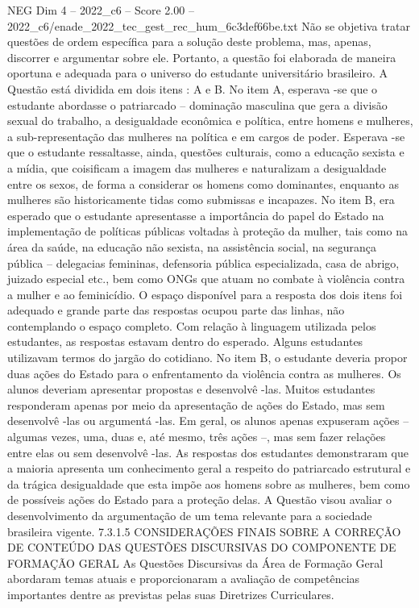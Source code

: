 \begin{textsample}{NEG Dim 4 – 2022\_c6 – Score 2.00 – 2022\_c6/enade\_2022\_tec\_gest\_rec\_hum\_6c3def66be.txt}
Não se objetiva tratar questões de ordem específica para a solução deste problema, mas, apenas, discorrer e argumentar sobre ele.
Portanto, a questão foi elaborada de maneira oportuna e adequada para o universo do estudante universitário brasileiro.
A Questão está dividida em dois itens : A e B.
No item A, esperava -se que o estudante abordasse o patriarcado – dominação masculina que gera a divisão sexual do trabalho, a desigualdade econômica e política, entre homens e mulheres, a sub-representação das mulheres na política e em cargos de poder.
Esperava -se que o estudante ressaltasse, ainda, questões culturais, como a educação sexista e a mídia, que coisificam a imagem das mulheres e naturalizam a desigualdade entre os sexos, de forma a considerar os homens como dominantes, enquanto as mulheres são historicamente tidas como submissas e incapazes.
No item B, era esperado que o estudante apresentasse a importância do papel do Estado na implementação de políticas públicas voltadas à proteção da mulher, tais como na área da saúde, na educação não sexista, na assistência social, na segurança pública – delegacias femininas, defensoria pública especializada, casa de abrigo, juizado especial etc., bem como ONGs que atuam no combate à violência contra a mulher e ao feminicídio.
O espaço disponível para a resposta dos dois itens foi adequado e grande parte das respostas ocupou parte das linhas, não contemplando o espaço completo.
Com relação à linguagem utilizada pelos estudantes, as respostas estavam dentro do esperado.
Alguns estudantes utilizavam termos do jargão do cotidiano.
No item B, o estudante deveria propor duas ações do Estado para o enfrentamento da violência contra as mulheres.
Os alunos deveriam apresentar propostas e desenvolvê -las.
Muitos estudantes responderam apenas por meio da apresentação de ações do Estado, mas sem desenvolvê -las ou argumentá -las.
Em geral, os alunos apenas expuseram ações – algumas vezes, uma, duas e, até mesmo, três ações –, mas sem fazer relações entre elas ou sem desenvolvê -las.
As respostas dos estudantes demonstraram que a maioria apresenta um conhecimento geral a respeito do patriarcado estrutural e da trágica desigualdade que esta impõe aos homens sobre as mulheres, bem como de possíveis ações do Estado para a proteção delas.
A Questão visou avaliar o desenvolvimento da argumentação de um tema relevante para a sociedade brasileira vigente. 7.3.1.5 CONSIDERAÇÕES FINAIS SOBRE A CORREÇÃO DE CONTEÚDO DAS QUESTÕES DISCURSIVAS DO COMPONENTE DE FORMAÇÃO GERAL As Questões Discursivas da Área de Formação Geral abordaram temas atuais e proporcionaram a avaliação de competências importantes dentre as previstas pelas suas Diretrizes Curriculares.

\end{textsample}
